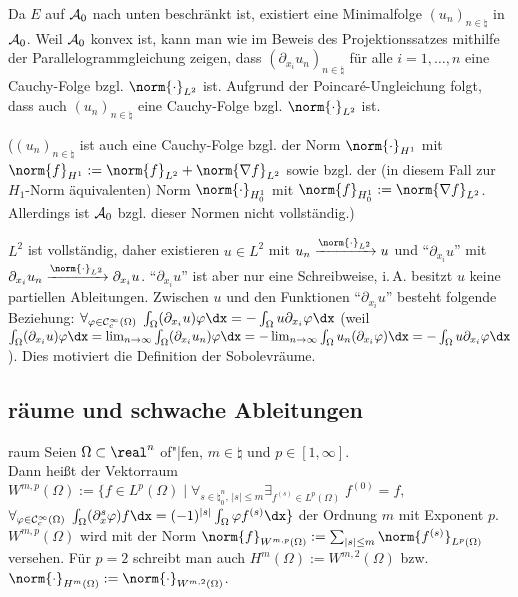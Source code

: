 \begin{Bem}
    Da $E$ auf $\mathcal{A}_0$ nach unten beschränkt ist, existiert eine Minimalfolge
    $(u_n)_{n \in \natural}$ in $\mathcal{A}_0$.
    Weil $\mathcal{A}_0$ konvex ist, kann man wie im Beweis des Projektionssatzes mithilfe der
    Parallelogrammgleichung zeigen, dass $(\partial_{x_i} u_n)_{n \in \natural}$ für alle
    $i = 1, \dotsc, n$ eine Cauchy-Folge bzgl. $\norm{\cdot}_{L^2}$ ist.
    Aufgrund der Poincaré-Ungleichung folgt, dass auch $(u_n)_{n \in \natural}$ eine
    Cauchy-Folge bzgl. $\norm{\cdot}_{L^2}$ ist.
    
    ($(u_n)_{n \in \natural}$ ist auch eine Cauchy-Folge bzgl. der Norm $\norm{\cdot}_{H^1}$
    mit $\norm{f}_{H^1} := \norm{f}_{L^2} + \norm{\nabla f}_{L^2}$
    sowie bzgl. der (in diesem Fall zur $H_1$-Norm äquivalenten) Norm $\norm{\cdot}_{H^1_0}$
    mit $\norm{f}_{H^1_0} := \norm{\nabla f}_{L^2}$.
    Allerdings ist $\mathcal{A}_0$ bzgl. dieser Normen nicht vollständig.)
    
    $L^2$ ist vollständig,
    daher existieren $u \in L^2$ mit $u_n \xrightarrow{\norm{\cdot}_{L^2}} u$ und
    "`$\partial_{x_i} u$"' mit $\partial_{x_i} u_n \xrightarrow{\norm{\cdot}_{L^2}}
    \partial_{x_i} u$.
    "`$\partial_{x_i} u$"' ist aber nur eine Schreibweise, i.\,A. besitzt $u$ keine partiellen
    Ableitungen.
    Zwischen $u$ und den Funktionen "`$\partial_{x_i} u$"' besteht folgende Beziehung:
    $\forall_{\varphi \in \C^\infty_c(\Omega)}\;
    \int_\Omega (\partial_{x_i} u) \varphi \dx = -\int_\Omega u \partial_{x_i} \varphi \dx$
    (weil $\int_\Omega (\partial_{x_i} u) \varphi \dx
    = \lim_{n \to \infty} \int_\Omega (\partial_{x_i} u_n) \varphi \dx
    = -\lim_{n \to \infty} \int_\Omega u_n (\partial_{x_i} \varphi) \dx
    = -\int_\Omega u \partial_{x_i} \varphi \dx$).
    Dies motiviert die Definition der Sobolevräume.
\end{Bem}

\subsection{%
    räume und schwache Ableitungen%
}

\begin{Def}{raum}
    Seien $\Omega \subset \real^n$ of"|fen, $m \in \natural$ und $p \in [1, \infty]$.\\
    Dann heißt der Vektorraum
    $W^{m,p}(\Omega) := \{f \in L^p(\Omega) \;|\; \forall_{s \in \natural_0^n,\, |s| \le m}
    \exists_{f^{(s)} \in L^p(\Omega)}\; f^{(0)} = f,$\\
    $\forall_{\varphi \in \C^\infty_c(\Omega)}\;
    \int_\Omega (\partial_x^s \varphi) f \dx = (-1)^{|s|} \int_\Omega \varphi f^{(s)} \dx\}$
     der Ordnung $m$ mit Exponent $p$.\\
    $W^{m,p}(\Omega)$ wird mit der Norm
    $\norm{f}_{W^{m,p}(\Omega)} := \sum_{|s| \le m} \norm{f^{(s)}}_{L^p(\Omega)}$ versehen.
    Für $p = 2$ schreibt man auch $H^m(\Omega) := W^{m,2}(\Omega)$ bzw.
    $\norm{\cdot}_{H^m(\Omega)} := \norm{\cdot}_{W^{m,2}(\Omega)}$.
\end{Def}

